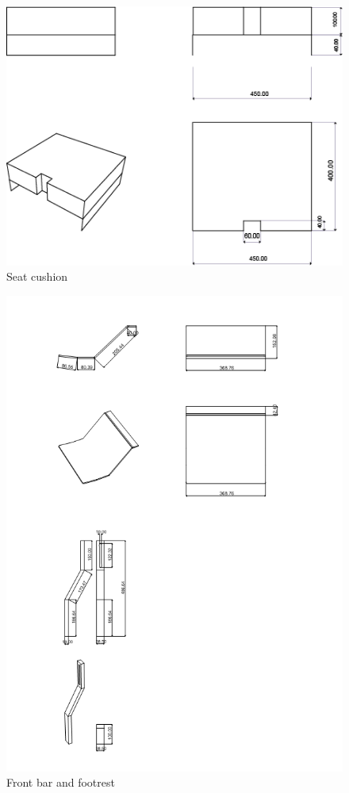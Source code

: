 \begin{figure}[h]
\centering
\includegraphics[width=15cm]{images/almofadadebaixo.png}
\caption{Seat cushion}
\label{fig:seatcushion}
\end{figure}

\begin{figure}[h]
\centering
\includegraphics[width=15cm]{images/barraepes.png}
\caption{Front bar and footrest}
\label{fig:frontbarandfootrest}
\end{figure}

